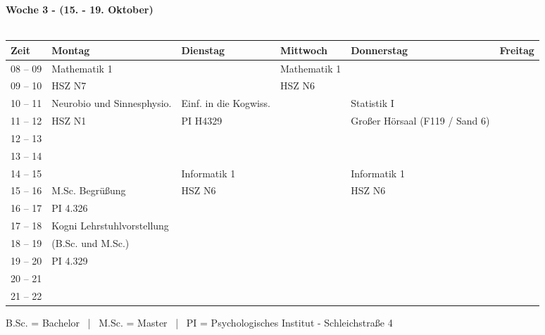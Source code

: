 \textbf{Woche 3 - (15. - 19. Oktober)}\\
\\
\begin{tabular}{|l|p{}|p{}|p{}|p{}|p{}|} \hline
 Zeit & Montag & Dienstag & Mittwoch & Donnerstag & Freitag \\ \hline \hline
 08 -- 09 & \footnotesize{Mathematik 1} & & \footnotesize{Mathematik 1} & & \\ \cline{1-1}
 09 -- 10 & \scriptsize{HSZ N7} & & \scriptsize{HSZ N6} & & \\ \hline
 10 -- 11 & \footnotesize{Neurobio und Sinnesphysio.} & \footnotesize{Einf. in die Kogwiss.} & & \footnotesize{Statistik I} & \\ \cline{1-1} 
 11 -- 12 & \scriptsize{HSZ N1} & \scriptsize{PI H4329} & & \scriptsize{Großer Hörsaal (F119 / Sand 6)} & \\ \hline
 12 -- 13 & & & & & \\ \cline{1-1}
 13 -- 14 & & & & & \\ \hline
 14 -- 15 & & \footnotesize{Informatik 1} & & \footnotesize{Informatik 1} & \\ \cline{1-2}
 15 -- 16 & \scriptsize{M.Sc. Begrüßung} & \scriptsize{HSZ N6} & & \scriptsize{HSZ N6} & \\ \cline{1-1} \cline{3-6}
 16 -- 17 & \scriptsize{PI 4.326} & & & & \\ \cline{1-2}
 17 -- 18 & \scriptsize{Kogni Lehr\-stuhl\-vor\-stell\-ung} & & & & \\ \cline{1-1} \cline{3-6}
 18 -- 19 & \scriptsize{(B.Sc. und M.Sc.)} & & & & \\ \cline{1-1}
 19 -- 20 & \scriptsize{PI 4.329}& & & & \\ \hline
 20 -- 21 & & & & & \\ \cline{1-1}
 21 -- 22 & & & & & \\ \hline
\end{tabular}

\scriptsize{B.Sc. = Bachelor ~|~ M.Sc. = Master ~|~ PI = Psychologisches Institut - Schleichstraße 4}

